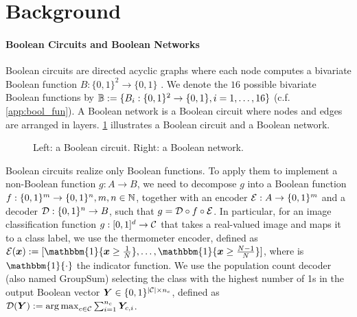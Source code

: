 \section{Background} \label{sec:background}

\paragraph{Boolean Circuits and Boolean Networks} Boolean circuits are 
directed acyclic graphs where each node computes a bivariate 
Boolean function $B:\{0,1\}^2\rightarrow \{0,1\}$ \cite{arora2009computational}.
We denote the $16$ possible bivariate Boolean functions by 
${\mathbb{B}}:= \{B_i: \{0,1\}^2 \rightarrow \{0,1\}, i=1,\ldots, 16\}$ (c.f. \cref{app:bool_fun}).
A Boolean network is a Boolean circuit 
where nodes and edges are arranged in layers. \cref{fig:boolean_circuit_and_network} illustrates a Boolean circuit and a Boolean network.

\begin{figure}
\centering
\resizebox{.7\linewidth}{!}{}
\caption{Left: a Boolean circuit. Right: a Boolean network.}\label{fig:boolean_circuit_and_network}
\vspace{-1em}
\end{figure}

Boolean circuits realize only Boolean functions.
To apply them to implement a non-Boolean function $g:A\rightarrow B$, 
we need to decompose $g$ into a Boolean function $f:\{0,1\}^{m} \rightarrow \{0,1\}^n, m,n\in {\mathbb{N}}$, together with 
an encoder ${\mathcal{E}}:A \rightarrow \{0,1\}^m$ and a decoder ${\mathcal{D}}: \{0,1\}^n\rightarrow B$, such that $g={\mathcal{D}}  \circ f\circ {\mathcal{E}}$.
In particular, for an image classification function 
  $g:[0,1]^d \rightarrow {\mathcal{C}}$  that takes a real-valued image and maps it to a class label, we %
  use the thermometer encoder, defined as $\gE(\vx) := [\mathbbm{1}\{\vx \ge \frac{1}{N}\}, \dots, \mathbbm{1}\{\vx \ge \frac{N-1}{N}\}]$, where is $\mathbbm{1}\{\cdot\}$ the indicator function. We use the population count decoder (also named GroupSum) selecting the class with
 the highest number of 1s in the output Boolean vector ${\bm{Y}} \in \{0,1\}^{|{\mathcal{C}}| \times n_c}$, defined as ${\mathcal{D}}({\bm{Y}}):= \operatorname*{arg\,max}_{c \in {\mathcal{C}}} \sum_{i=1}^{n_c} {\bm{Y}}_{c,i}$.


